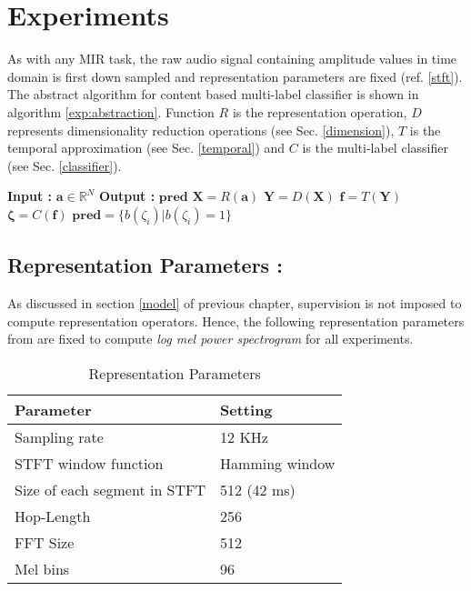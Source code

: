 \section{Experiments}
\label{experiments}
 
As with any MIR task, the raw audio signal containing amplitude values in time domain is first down sampled and representation parameters are fixed (ref. \ref{stft}). The abstract algorithm for content based multi-label classifier is shown in algorithm \ref{exp:abstraction}. Function $R$ is the representation operation, $D$ represents dimensionality reduction operations (see Sec. \ref{dimension}), $T$ is the temporal approximation (see Sec. \ref{temporal}) and $C$ is the multi-label classifier (see Sec. \ref{classifier}). 
 
\begin{algorithm}
  \caption{$\textbf{pred}$ = $Model$($\textbf{a}$) }\label{exp:abstraction}
  \begin{algorithmic}[1]
    \Statex \textbf{Input :} $\textbf{a} \in \mathbb{R}^{N}$
    \Statex \textbf{Output :} $\textbf{pred}$ 
    \State $\textbf{X} = R(\textbf{a})$ 
    \State $\textbf{Y} = D(\textbf{X})$ 
    \State $\textbf{f} = T(\textbf{Y})$ 
    \State $\bm{\zeta} = C(\textbf{f})$ 
    \State $\textbf{pred} = \{ b(\zeta_{i}) | b(\zeta_{i}) = 1 \}$ 
  \end{algorithmic}
\end{algorithm}
\FloatBarrier

\subsection{Representation Parameters :}
\label{repPara}
As discussed in section \ref{model} of previous chapter, supervision is not imposed to compute representation operators. Hence, the following  representation parameters from \cite{choi_cnn} are fixed to compute \textit{log mel power spectrogram} for all experiments. 

\begin{table}[H]
\label{tab:repPara}
\centering
\begin{tabular}{| p{} | p{}|}
\hline
\textbf{Parameter} & \textbf{Setting}\\
\hline
Sampling rate & 12 KHz\\
\hline
STFT window function & Hamming window\\
\hline
Size of each segment in STFT & 512 (42 ms)\\
\hline
Hop-Length & 256\\
\hline
FFT Size & 512\\
\hline
Mel bins & 96\\
\hline
\end{tabular}
\caption{Representation Parameters} 
\end{table}
\FloatBarrier

